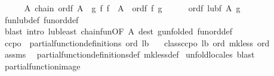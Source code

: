 \begin{isabellebody}
\ \ \ \ \isamarkupfalse%
\ A{\isacharcolon}{\kern0pt}\ {\isachardoublequoteopen}chain\ {\isacharquery}{\kern0pt}ordf\ A{\isachardoublequoteclose}\ \ g{\isacharcolon}{\kern0pt}\ {\isachardoublequoteopen}{\isasymAnd}f{\isachardot}{\kern0pt}\ f\ {\isasymin}\ A\ {\isasymLongrightarrow}\ {\isacharquery}{\kern0pt}ordf\ f\ g{\isachardoublequoteclose}\isanewline
\ \ \ \ \isamarkupfalse%
\ {\isachardoublequoteopen}{\isacharquery}{\kern0pt}ordf\ {\isacharparenleft}{\kern0pt}{\isacharquery}{\kern0pt}lubf\ A{\isacharparenright}{\kern0pt}\ g{\isachardoublequoteclose}\ \isamarkupfalse%
\ fun{\isacharunderscore}{\kern0pt}lub{\isacharunderscore}{\kern0pt}def\ fun{\isacharunderscore}{\kern0pt}ord{\isacharunderscore}{\kern0pt}def\isanewline
\ \ \ \ \ \ \isamarkupfalse%
\ {\isacharparenleft}{\kern0pt}blast\ intro{\isacharcolon}{\kern0pt}\ lub{\isacharunderscore}{\kern0pt}least\ chain{\isacharunderscore}{\kern0pt}fun{\isacharbrackleft}{\kern0pt}OF\ A{\isacharbrackright}{\kern0pt}\ dest{\isacharcolon}{\kern0pt}\ g{\isacharbrackleft}{\kern0pt}unfolded\ fun{\isacharunderscore}{\kern0pt}ord{\isacharunderscore}{\kern0pt}def{\isacharbrackright}{\kern0pt}{\isacharparenright}{\kern0pt}\isanewline
\ \ \ \isamarkupfalse%
\isanewline
{}\isamarkupfalse%
%
\endisatagproof
{\isafoldproof}%
%
\isadelimproof
\isanewline
%
\endisadelimproof
\isanewline
{}\isamarkupfalse%
\ ccpo{\isacharcolon}{\kern0pt}\ \ {\isachardoublequoteopen}partial{\isacharunderscore}{\kern0pt}function{\isacharunderscore}{\kern0pt}definitions\ ord\ lb{\isachardoublequoteclose}\isanewline
\ \ \ {\isachardoublequoteopen}class{\isachardot}{\kern0pt}ccpo\ lb\ ord\ {\isacharparenleft}{\kern0pt}mk{\isacharunderscore}{\kern0pt}less\ ord{\isacharparenright}{\kern0pt}{\isachardoublequoteclose}\isanewline
%
\isadelimproof
%
\endisadelimproof
%
\isatagproof
{}\isamarkupfalse%
\ assms\ \isamarkupfalse%
\ partial{\isacharunderscore}{\kern0pt}function{\isacharunderscore}{\kern0pt}definitions{\isacharunderscore}{\kern0pt}def\ mk{\isacharunderscore}{\kern0pt}less{\isacharunderscore}{\kern0pt}def\isanewline
{}\isamarkupfalse%
\ unfold{\isacharunderscore}{\kern0pt}locales\ blast{\isacharplus}{\kern0pt}%
\endisatagproof
{\isafoldproof}%
%
\isadelimproof
\isanewline
%
\endisadelimproof
\isanewline
{}\isamarkupfalse%
\ partial{\isacharunderscore}{\kern0pt}function{\isacharunderscore}{\kern0pt}image{\isacharcolon}{\kern0pt}\isanewline

\end{isabellebody}
